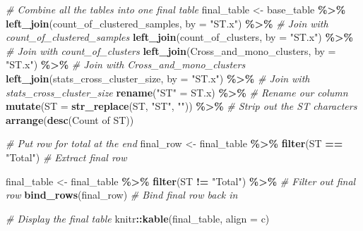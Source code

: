 \documentclass[
]{article}
\newenvironment{Shaded}{\begin{snugshade}}{\end{snugshade}}
\newcommand{\AttributeTok}[1]{\textcolor[rgb]{0.13,0.29,0.53}{#1}}
\newcommand{\CommentTok}[1]{\textcolor[rgb]{0.56,0.35,0.01}{\textit{#1}}}
\newcommand{\FunctionTok}[1]{\textcolor[rgb]{0.13,0.29,0.53}{\textbf{#1}}}
\newcommand{\NormalTok}[1]{#1}
\newcommand{\OtherTok}[1]{\textcolor[rgb]{0.56,0.35,0.01}{#1}}
\newcommand{\SpecialCharTok}[1]{\textcolor[rgb]{0.81,0.36,0.00}{\textbf{#1}}}
\newcommand{\StringTok}[1]{\textcolor[rgb]{0.31,0.60,0.02}{#1}}
\begin{document}
\begin{Shaded}
\begin{Highlighting}[]
\CommentTok{\# Combine all the tables into one final table}
\NormalTok{final\_table }\OtherTok{\textless{}{-}}\NormalTok{ base\_table }\SpecialCharTok{\%\textgreater{}\%}
  \FunctionTok{left\_join}\NormalTok{(count\_of\_clustered\_samples, }\AttributeTok{by =} \StringTok{"ST.x"}\NormalTok{) }\SpecialCharTok{\%\textgreater{}\%}  \CommentTok{\# Join with count\_of\_clustered\_samples}
  \FunctionTok{left\_join}\NormalTok{(count\_of\_clusters, }\AttributeTok{by =} \StringTok{"ST.x"}\NormalTok{) }\SpecialCharTok{\%\textgreater{}\%}           \CommentTok{\# Join with count\_of\_clusters}
  \FunctionTok{left\_join}\NormalTok{(Cross\_and\_mono\_clusters, }\AttributeTok{by =} \StringTok{"ST.x"}\NormalTok{) }\SpecialCharTok{\%\textgreater{}\%}     \CommentTok{\# Join with Cross\_and\_mono\_clusters}
  \FunctionTok{left\_join}\NormalTok{(stats\_cross\_cluster\_size, }\AttributeTok{by =} \StringTok{"ST.x"}\NormalTok{) }\SpecialCharTok{\%\textgreater{}\%}    \CommentTok{\# Join with stats\_cross\_cluster\_size}
  \FunctionTok{rename}\NormalTok{(}\StringTok{"ST"} \OtherTok{=}\NormalTok{ ST.x) }\SpecialCharTok{\%\textgreater{}\%}                                 \CommentTok{\# Rename our column}
  \FunctionTok{mutate}\NormalTok{(}\AttributeTok{ST =} \FunctionTok{str\_replace}\NormalTok{(ST, }\StringTok{"ST"}\NormalTok{, }\StringTok{""}\NormalTok{)) }\SpecialCharTok{\%\textgreater{}\%}              \CommentTok{\# Strip out the ST characters}
  \FunctionTok{arrange}\NormalTok{(}\FunctionTok{desc}\NormalTok{(}\StringTok{\textasciigrave{}}\AttributeTok{Count of ST}\StringTok{\textasciigrave{}}\NormalTok{))}

\CommentTok{\# Put row for total at the end}
\NormalTok{final\_row }\OtherTok{\textless{}{-}}\NormalTok{ final\_table }\SpecialCharTok{\%\textgreater{}\%} \FunctionTok{filter}\NormalTok{(ST }\SpecialCharTok{==} \StringTok{"Total"}\NormalTok{) }\CommentTok{\# Extract final row}

\NormalTok{final\_table }\OtherTok{\textless{}{-}}\NormalTok{ final\_table }\SpecialCharTok{\%\textgreater{}\%} \FunctionTok{filter}\NormalTok{(ST }\SpecialCharTok{!=} \StringTok{"Total"}\NormalTok{) }\SpecialCharTok{\%\textgreater{}\%} \CommentTok{\# Filter out final row}
  \FunctionTok{bind\_rows}\NormalTok{(final\_row)                                   }\CommentTok{\# Bind final row back in}

\CommentTok{\# Display the final table}
\NormalTok{knitr}\SpecialCharTok{::}\FunctionTok{kable}\NormalTok{(final\_table, }\AttributeTok{align =} \StringTok{\textquotesingle{}c\textquotesingle{}}\NormalTok{)}
\end{Highlighting}
\end{Shaded}
\end{document}
